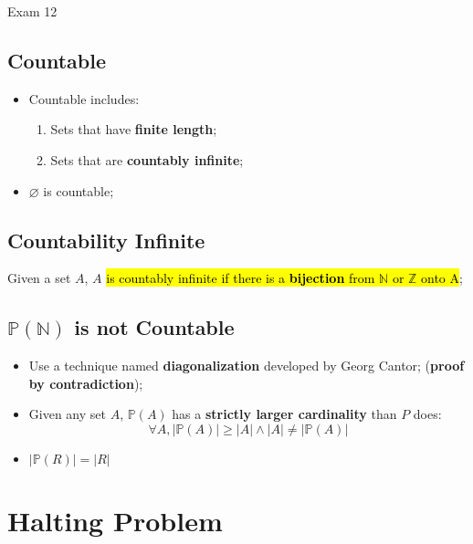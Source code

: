\documentclass{note}
\begin{document}
\begin{note}{Exam 12}
    \subsection{Countable}
    
    \begin{itemize}
        \item Countable includes:
        \begin{enumerate}
            \item Sets that have \textbf{finite length};
            \item Sets that are \textbf{countably infinite};
        \end{enumerate}
        
        \item $ \varnothing $ is countable;
    \end{itemize}
    
    \subsection{Countability Infinite}
    
    Given a set $ A $, $ A $ \hl{is countably infinite if there is a \textbf{bijection} from $ \mathbb{N} $ or $ \mathbb{Z} $
    onto A};

    \subsection{$ \mathbb{P} (\mathbb{N} ) $ is not Countable}
    
    \begin{itemize}
        \item Use a technique named \textbf{diagonalization} developed by Georg Cantor; (\textbf{proof by contradiction});
        
        \item Given any set $ A $, $ \mathbb{P}(A) $ has a \textbf{strictly larger cardinality} than $ P $ does:
        \begin{equation}
            \forall A, \left| \mathbb{P}(A) \right| \geq \left| A \right| \wedge \left| A \right| \neq \left| \mathbb{P}(A) \right|
        \end{equation} 
        
        \item $ \left| \mathbb{P}(R) \right| = \left| R \right| $
    \end{itemize}

\section{Halting Problem}


\end{note}
\end{document}
